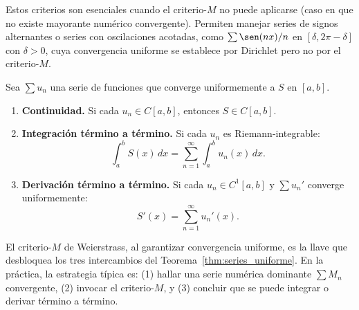 \begin{rem}
Estos criterios son esenciales cuando el criterio-$M$ no puede
aplicarse (caso en que no existe mayorante numérico convergente).
Permiten manejar series de signos alternantes o series con oscilaciones
acotadas, como $\sum \sen(nx)/n$ en $[\delta, 2\pi-\delta]$ con
$\delta>0$, cuya convergencia uniforme se establece por Dirichlet
pero no por el criterio-$M$.
\end{rem}

\begin{theorem}
\label{thm:series_uniforme}
Sea $\sum u_n$ una serie de funciones que converge uniformemente a
$S$ en $[a,b]$.
\begin{enumerate}
    \item \textbf{Continuidad.} Si cada $u_n \in C[a,b]$, entonces
          $S \in C[a,b]$.
    \item \textbf{Integración término a término.} Si cada $u_n$ es
          Riemann-integrable:
          \[
              \int_a^b S(x)\,dx
              = \sum_{n=1}^\infty \int_a^b u_n(x)\,dx.
          \]
    \item \textbf{Derivación término a término.} Si cada
          $u_n \in C^1[a,b]$ y $\sum u_n'$ converge uniformemente:
          \[
              S'(x) = \sum_{n=1}^\infty u_n'(x).
          \]
\end{enumerate}
\end{theorem}

\begin{rem}
El criterio-$M$ de Weierstrass, al garantizar convergencia uniforme,
es la llave que desbloquea los tres intercambios del
Teorema~\ref{thm:series_uniforme}. En la práctica, la estrategia
típica es: (1) hallar una serie numérica dominante $\sum M_n$
convergente, (2) invocar el criterio-$M$, y (3) concluir que se puede
integrar o derivar término a término.
\end{rem}

